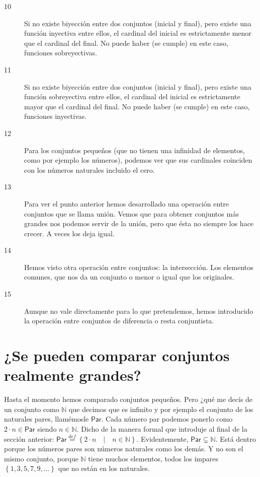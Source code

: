 \documentclass{amsart}
\theoremstyle{definition}
\theoremstyle{remark}
\numberwithin{equation}{section}
\newcommand{\set}[1]{\left\lbrace{#1}\right\rbrace}
\newcommand{\setprop}[2]{\left\lbrace{ #1 }\quad|\quad{ #2 }\right\rbrace}
\newcommand{\setN}{\mathds N}
\newcommand{\defin}{\overset {def}{=}}
\begin{document}
\begin{description}
  \item[10] Si no existe biyección entre dos conjuntos (inicial y final), 
  pero existe una función inyectiva entre ellos, el cardinal del inicial es 
  estrictamente menor que el cardinal del final. No puede haber (se cumple) 
  en este caso, funciones sobreyectivas.
  \item[11] Si no existe biyección entre dos conjuntos (inicial y final), 
  pero existe una función sobreyectiva entre ellos, el cardinal del inicial 
  es estrictamente mayor que el cardinal del final. No puede haber (se 
  cumple) en este caso, funciones inyectivas.
  \item[12] Para los conjuntos pequeños (que no tienen una infinidad de 
  elementos, como por ejemplo los números), podemos ver que sus cardinales 
  coinciden con los números naturales incluido el cero.
  \item[13] Para ver el punto anterior hemos desarrollado una operación 
  entre conjuntos que se llama unión. Vemos que para obtener conjuntos más 
  grandes nos podemos servir de la unión, pero que ésta no siempre los hace 
  crecer. A veces los deja igual.
  \item[14] Hemos visto otra operación entre conjuntos: la intersección. 
  Los elementos comunes, que nos da un conjunto o menor o igual que los 
  originales.
  \item[15] Aunque no vale directamente para lo que pretendemos, hemos 
  introducido la operación entre conjuntos de diferencia o resta 
  conjuntista.
\end{description}


\section{ ¿Se pueden comparar conjuntos realmente grandes? }


	Hasta el momento hemos comparado conjuntos pequeños. Pero ¿qué me decís 
de un conjunto como $\setN$ que decimos que es infinito y por ejemplo el 
conjunto de los naturales pares, llamémosle $\textsf{Par}$. Cada número par 
podemos ponerlo como $2 \cdot n \in \textsf{Par}$ siendo $n \in \setN$. Dicho 
de la manera formal que introduje al final de la sección anterior: 
$\textsf{Par} \defin \setprop{2 \cdot n}{n \in \setN}$. Evidentemente, 
$\textsf{Par} \subsetneq \setN$. Está dentro porque los números pares son 
números naturales como los demás. Y no son el mismo conjunto, porque $\setN$ 
tiene muchos elementos, todos los impares $\set{1, 3, 5, 7, 9, ...}$ que no 
están en los naturales.
\end{document}

